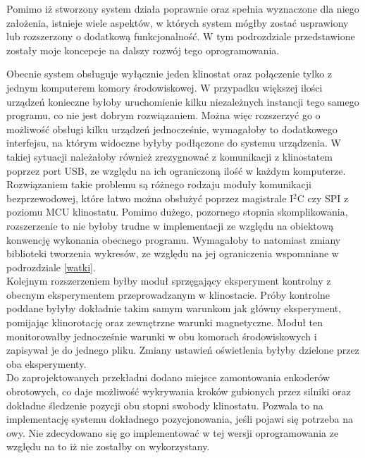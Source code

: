 Pomimo iż stworzony system działa poprawnie oraz spełnia wyznaczone dla niego założenia, istnieje wiele aspektów, w których system mógłby zostać usprawiony lub rozszerzony o dodatkową funkcjonalność. W tym podrozdziale przedstawione zostały moje koncepcje na dalszy rozwój tego oprogramowania.\newline

Obecnie system obsługuje wyłącznie jeden klinostat oraz połączenie tylko z jednym komputerem komory środowiskowej. W przypadku większej ilości urządzeń konieczne byłoby uruchomienie kilku niezależnych instancji tego samego programu, co nie jest dobrym rozwiązaniem. Można więc rozszerzyć go o możliwość obsługi kilku urządzeń jednocześnie, wymagałoby to dodatkowego interfejsu, na którym widoczne byłyby podłączone do systemu urządzenia. W takiej sytuacji należałoby również zrezygnować z komunikacji z klinostatem poprzez port USB, ze względu na ich ograniczoną ilość w każdym komputerze. Rozwiązaniem takie problemu są różnego rodzaju moduły komunikacji bezprzewodowej, które łatwo można obsłużyć poprzez magistrale I$^2$C czy SPI z poziomu MCU klinostatu. Pomimo dużego, pozornego stopnia skomplikowania, rozszerzenie to nie byłoby trudne w implementacji ze względu na obiektową konwencję wykonania obecnego programu. Wymagałoby to natomiast zmiany biblioteki tworzenia wykresów, ze względu na jej ograniczenia wspomniane w podrozdziale \ref{watki}.\\

Kolejnym rozszerzeniem byłby moduł sprzęgający eksperyment kontrolny z obecnym eksperymentem przeprowadzanym w klinostacie. Próby kontrolne poddane byłyby dokładnie takim samym warunkom jak główny eksperyment, pomijając klinorotację oraz zewnętrzne warunki magnetyczne. Moduł ten monitorowałby jednocześnie warunki w obu komorach środowiskowych i zapisywał je do jednego pliku. Zmiany ustawień oświetlenia byłyby dzielone przez oba eksperymenty.\\

Do zaprojektowanych przekładni dodano miejsce zamontowania enkoderów obrotowych, co daje możliwość wykrywania kroków gubionych przez silniki oraz dokładne śledzenie pozycji obu stopni swobody klinostatu. Pozwala to na implementację systemu dokładnego pozycjonowania, jeśli pojawi się potrzeba na owy. Nie zdecydowano się go implementować w tej wersji oprogramowania ze względu na to iż nie zostałby on wykorzystany.\\

